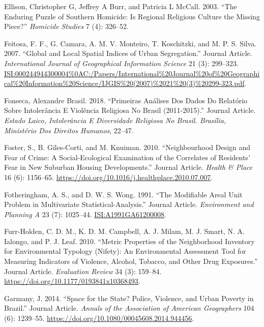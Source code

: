 \documentclass[smallextended]{svjour3}       %
\begin{document}
\leavevmode\hypertarget{ref-Ellison2003enduring}{}%
Ellison, Christopher G, Jeffrey A Burr, and Patricia L McCall. 2003.
``The Enduring Puzzle of Southern Homicide: Is Regional Religious
Culture the Missing Piece?'' \emph{Homicide Studies} 7 (4): 326--52.

\leavevmode\hypertarget{ref-Feitosa2007global}{}%
Feitosa, F. F., G. Camara, A. M. V. Monteiro, T. Koschitzki, and M. P.
S. Silva. 2007. ``Global and Local Spatial Indices of Urban
Segregation.'' Journal Article. \emph{International Journal of
Geographical Information Science} 21 (3): 299--323.
\url{ISI:000244944300004\%0AC:/Papers/International\%20Journal\%20of\%20Geographical\%20Information\%20Science/IJGIS\%20(2007)\%2021\%20(3)\%20299-323.pdf}.

\leavevmode\hypertarget{ref-Fonseca2018primeiras}{}%
Fonseca, Alexandre Brasil. 2018. ``Primeiras Análises Dos Dados Do
Relatório Sobre Intolerância E Violência Religiosa No Brasil
(2011-2015).'' Journal Article. \emph{Estado Laico, Intolerância E
Diversidade Religiosa No Brasil. Brasília, Ministério Dos Direitos
Humanos}, 22--47.

\leavevmode\hypertarget{ref-Foster2010neighbourhood}{}%
Foster, S., B. Giles-Corti, and M. Knuiman. 2010. ``Neighbourhood Design
and Fear of Crime: A Social-Ecological Examination of the Correlates of
Residents' Fear in New Suburban Housing Developments.'' Journal Article.
\emph{Health \& Place} 16 (6): 1156--65.
\url{https://doi.org/10.1016/j.healthplace.2010.07.007}.

\leavevmode\hypertarget{ref-Fotheringham1991modifiable}{}%
Fotheringham, A. S., and D. W. S. Wong. 1991. ``The Modifiable Areal
Unit Problem in Multivariate Statistical-Analysis.'' Journal Article.
\emph{Environment and Planning A} 23 (7): 1025--44.
\url{ISI:A1991GA61200008}.

\leavevmode\hypertarget{ref-Furr2010metric}{}%
Furr-Holden, C. D. M., K. D. M. Campbell, A. J. Milam, M. J. Smart, N.
A. Ialongo, and P. J. Leaf. 2010. ``Metric Properties of the
Neighborhood Inventory for Environmental Typology (Nifety): An
Environmental Assessment Tool for Measuring Indicators of Violence,
Alcohol, Tobacco, and Other Drug Exposures.'' Journal Article.
\emph{Evaluation Review} 34 (3): 159--84.
\url{https://doi.org/10.1177/0193841x10368493}.

\leavevmode\hypertarget{ref-Garmany2014space}{}%
Garmany, J. 2014. ``Space for the State? Police, Violence, and Urban
Poverty in Brazil.'' Journal Article. \emph{Annals of the Association of
American Geographers} 104 (6): 1239--55.
\url{https://doi.org/10.1080/00045608.2014.944456}.
\end{document}

